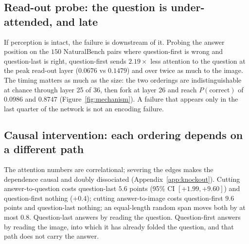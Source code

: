 \subsection{Read-out probe: the question is under-attended, and late}
\label{sec:anatomy-readout}

If perception is intact, the failure is downstream of it. Probing the answer
position on the $150$ NaturalBench pairs where question-first is wrong and
question-last is right, question-first sends $2.19\times$ less attention to the
question at the peak read-out layer ($0.0676$ vs $0.1479$) and over twice as
much to the image. The timing matters as much as the size: the two orderings are
indistinguishable at chance through layer 25 of 36, then fork at layer 26 and
reach $P(\text{correct})$ of $0.0986$ and $0.8747$ (Figure~\ref{fig:mechanism}).
A failure that appears only in the last quarter of the network is not an
encoding failure.


\subsection{Causal intervention: each ordering depends on a different path}
\label{sec:anatomy-knockout}

The attention numbers are correlational; severing the edges makes the dependence
causal and doubly dissociated (Appendix~\ref{app:knockout}). Cutting
answer-to-question costs question-last $5.6$ points (95\% CI $[+1.99, +9.60]$)
and question-first nothing ($+0.4$); cutting answer-to-image costs question-first
$9.6$ points and question-last nothing; an equal-length random span moves both by
at most $0.8$. Question-last answers by reading the question. Question-first
answers by reading the image, into which it has already folded the question, and
that path does not carry the answer.
